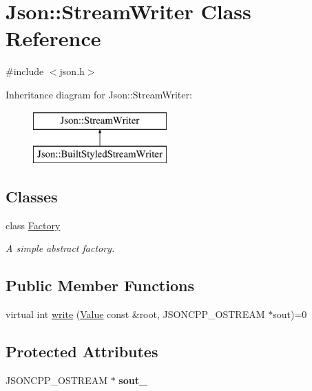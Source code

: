 \hypertarget{classJson_1_1StreamWriter}{}\section{Json\+:\+:Stream\+Writer Class Reference}
\label{classJson_1_1StreamWriter}


{\ttfamily \#include $<$json.\+h$>$}

Inheritance diagram for Json\+:\+:Stream\+Writer\+:\begin{figure}[H]
\begin{center}
\leavevmode
\includegraphics[height=2.000000cm]{classJson_1_1StreamWriter}
\end{center}
\end{figure}
\subsection*{Classes}
\begin{DoxyCompactItemize}
\item 
class \hyperlink{classJson_1_1StreamWriter_1_1Factory}{Factory}
\begin{DoxyCompactList}\small\item\em A simple abstract factory. \end{DoxyCompactList}\end{DoxyCompactItemize}
\subsection*{Public Member Functions}
\begin{DoxyCompactItemize}
\item 
virtual int \hyperlink{classJson_1_1StreamWriter_a84278bad0c9a9fc587bc2a97c5bb5993}{write} (\hyperlink{classJson_1_1Value}{Value} const \&root, J\+S\+O\+N\+C\+P\+P\+\_\+\+O\+S\+T\+R\+E\+AM $\ast$sout)=0
\end{DoxyCompactItemize}
\subsection*{Protected Attributes}
\begin{DoxyCompactItemize}
\item 
J\+S\+O\+N\+C\+P\+P\+\_\+\+O\+S\+T\+R\+E\+AM $\ast$ {\bfseries sout\+\_\+}\hypertarget{classJson_1_1StreamWriter_a4f5603d4228a9fa46a42cb44e5234d9b}{}\label{classJson_1_1StreamWriter_a4f5603d4228a9fa46a42cb44e5234d9b}

\end{DoxyCompactItemize}


